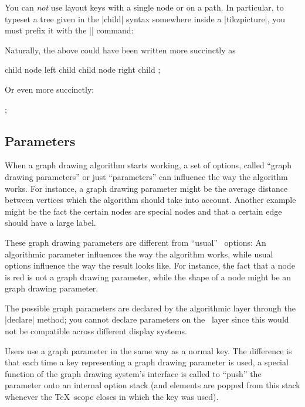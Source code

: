 \begin{command}{\pgfgdsetrequestcallback{}}
    You can \emph{not} use layout keys with a single node or on a path. In
    particular, to typeset a tree given in the |child| syntax somewhere inside
    a |{tikzpicture}|, you must prefix it with the |\scoped| command:
\begin{codeexample}[]
\end{codeexample}
    Naturally, the above could have been written more succinctly as
\begin{codeexample}[]
  child { node {left child} }
  child { node {right child} };
\end{codeexample}
    Or even more succinctly:
\begin{codeexample}[]
\tikz {};
\end{codeexample}
\end{command}


\subsection{Parameters}
\label{section-gd-parameters}

When a graph drawing algorithm starts working, a set of options, called ``graph
drawing parameters'' or just ``parameters'' can influence the way the algorithm
works. For instance, a graph drawing parameter might be the average distance
between vertices which the algorithm should take into account. Another example
might be the fact the certain nodes are special nodes and that a certain edge
should have a large label.

These graph drawing parameters are different from ``usual'' \pgfname\ options:
An algorithmic parameter influences the way the algorithm works, while usual
options influence the way the result looks like. For instance, the fact that a
node is red is not a graph drawing parameter, while the shape of a node might
be an graph drawing parameter.

The possible graph parameters are declared by the algorithmic layer through the
|declare| method; you cannot declare parameters on the \pgfname\ layer since
this would not be compatible across different display systems.

Users use a graph parameter in the same way as a normal key. The difference is
that each time a key representing a graph drawing parameter is used, a special
function of the graph drawing system's interface is called to ``push'' the
parameter onto an internal option stack (and elements are popped from this
stack whenever the \TeX\ scope closes in which the key was used).

